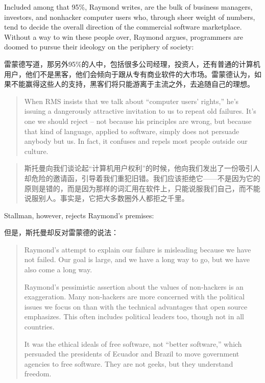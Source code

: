 \ifdefined\eng
Included among that 95\%, Raymond writes, are the bulk of business managers, investors, and nonhacker computer users who, through sheer weight of numbers, tend to decide the overall direction of the commercial software marketplace. Without a way to win these people over, Raymond argues, programmers are doomed to pursue their ideology on the periphery of society:
\fi

\ifdefined\chs
雷蒙德写道，那另外95\%的人中，包括很多公司经理，投资人，还有普通的计算机用户，他们不是黑客，他们会倾向于跟从专有商业软件的大市场。雷蒙德认为，如果不能赢得这些人的支持，黑客们将只能游离于主流之外，去追随自己的理想。
\fi

\ifdefined\eng
\begin{quote}
When RMS insists that we talk about ``computer users' rights,'' he's issuing a dangerously attractive invitation to us to repeat old failures. It's one we should reject -- not because his principles are wrong, but because that kind of language, applied to software, simply does not persuade anybody but us. In fact, it confuses and repels most people outside our culture.
\end{quote}
\fi

\ifdefined\chs
\begin{quote}
斯托曼向我们谈论起``计算机用户权利''的时候，他向我们发出了一份吸引人却危险的邀请函，引导着我们重犯旧错。我们应该拒绝它——不是因为它的原则是错的，而是因为那样的词汇用在软件上，只能说服我们自己，而不能说服别人。事实是，它把大多数圈外人都拒之千里。
\end{quote}
\fi

\ifdefined\vtwo

\ifdefined\eng
Stallman, however, rejects Raymond's premises:
\fi

\ifdefined\chs
但是，斯托曼却反对雷蒙德的说法：
\fi

\ifdefined\eng
\begin{quote}
Raymond's attempt to explain our failure is misleading because we have not failed.  Our goal is large, and we have a long way to go, but we have also come a long way.

Raymond's pessimistic assertion about the values of non-hackers is an exaggeration.  Many non-hackers are more concerned with the political issues we focus on than with the technical advantages that open source emphasizes.  This often includes political leaders too, though not in all countries.

It was the ethical ideals of free software, not ``better software,'' which persuaded the presidents of Ecuador and Brazil to move government agencies to free software.  They are not geeks, but they understand freedom.
\end{quote}
\fi

